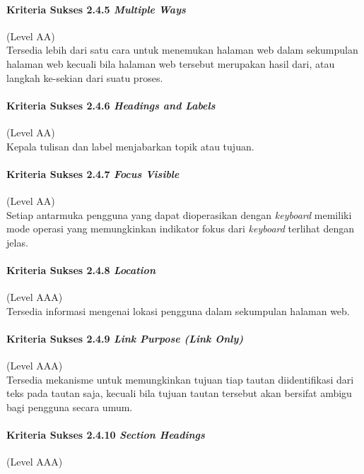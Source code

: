 \paragraph{Kriteria Sukses 2.4.5 \textit{Multiple Ways}}
\label{sec:kriteria_sukses_2.4.5}
(Level AA)\\

Tersedia lebih dari satu cara untuk menemukan halaman web dalam sekumpulan halaman web kecuali bila halaman web tersebut merupakan hasil dari, atau langkah ke-sekian dari suatu proses.

\paragraph{Kriteria Sukses 2.4.6 \textit{Headings and Labels}}
\label{sec:kriteria_sukses_2.4.6}
(Level AA)\\
Kepala tulisan dan label menjabarkan topik atau tujuan.

\paragraph{Kriteria Sukses 2.4.7 \textit{Focus Visible}}
\label{sec:kriteria_sukses_2.4.7}
(Level AA)\\

Setiap antarmuka pengguna yang dapat dioperasikan dengan \textit{keyboard} memiliki mode operasi yang memungkinkan indikator fokus dari \textit{keyboard} terlihat dengan jelas.

\paragraph{Kriteria Sukses 2.4.8 \textit{Location}}
\label{sec:kriteria_sukses_2.4.8}
(Level AAA)\\

Tersedia informasi mengenai lokasi pengguna dalam sekumpulan halaman web.

\paragraph{Kriteria Sukses 2.4.9 \textit{Link Purpose (Link Only)}}
\label{sec:kriteria_sukses_2.4.9}
(Level AAA)\\

Tersedia mekanisme untuk memungkinkan tujuan tiap tautan diidentifikasi dari teks pada tautan saja, kecuali bila tujuan tautan tersebut akan bersifat ambigu bagi pengguna secara umum.

\paragraph{Kriteria Sukses 2.4.10 \textit{Section Headings}}
\label{sec:kriteria_sukses_2.4.10}
(Level AAA)\\

